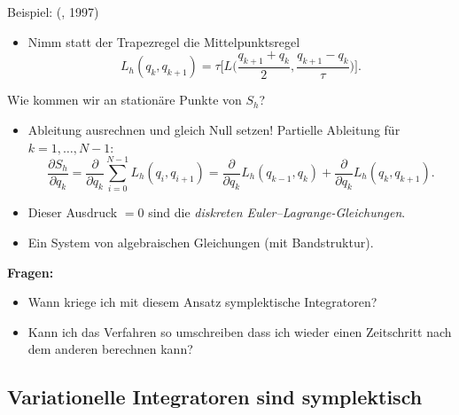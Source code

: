 Beispiel: (\citet{wendlandt_marsden:1997}, 1997)
\begin{itemize}
\item Nimm statt der Trapezregel die Mittelpunktsregel
\begin{equation*}
L_h(q_k, q_{k+1}) = \tau \Big[L\Big(\frac{q_{k+1} + q_k}{2}, \frac{q_{k+1} - q_k}{\tau}\Big)\Big].
\end{equation*}
\end{itemize}

Wie kommen wir an stationäre Punkte von $S_h$?
\begin{itemize}
\item Ableitung ausrechnen und gleich Null setzen!
\newline Partielle Ableitung für $k=1, \dots, N-1$:
\begin{equation*}
\frac{\partial S_h}{\partial q_k}
=
\frac{\partial}{\partial q_k} \sum_{i=0}^{N-1} L_h (q_i, q_{i+1})
=
\frac{\partial}{\partial q_k} L_h(q_{k-1}, q_k) +  \frac{\partial}{\partial q_k} L_h(q_k, q_{k+1}).
\end{equation*}
\item Dieser Ausdruck $=0$ sind die \emph{diskreten Euler--Lagrange-Gleichungen}.
\item Ein System von algebraischen Gleichungen (mit Bandstruktur).
\end{itemize}

\medskip

\textbf{Fragen:}
\begin{itemize}
\item Wann kriege ich mit diesem Ansatz symplektische Integratoren?
\item Kann ich das Verfahren so umschreiben dass ich wieder einen Zeitschritt nach dem anderen berechnen kann?
\end{itemize}

\subsection{Variationelle Integratoren sind symplektisch}

